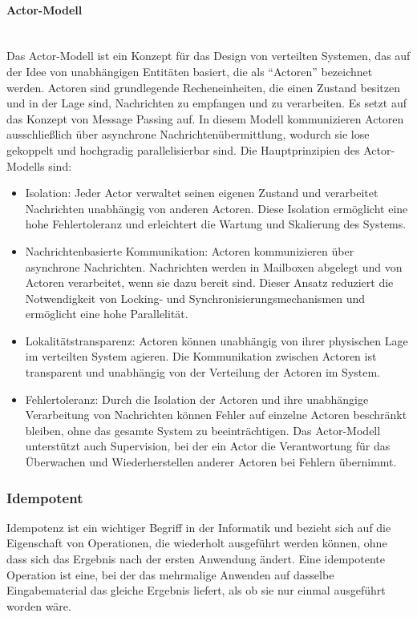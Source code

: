 \documentclass[../vs-script-first-v01.tex]{subfiles}
\begin{document}
\paragraph{Actor-Modell}\mbox{}\\
Das Actor-Modell ist ein Konzept für das Design von verteilten Systemen, das auf der Idee von unabhängigen Entitäten basiert, die als \enquote{Actoren} bezeichnet werden. Actoren sind grundlegende Recheneinheiten, die einen Zustand besitzen und in der Lage sind, Nachrichten zu empfangen und zu verarbeiten. Es setzt auf das Konzept von Message Passing auf. In diesem Modell kommunizieren Actoren ausschließlich über asynchrone Nachrichtenübermittlung, wodurch sie lose gekoppelt und hochgradig parallelisierbar sind. Die Hauptprinzipien des Actor-Modells sind:
\begin{itemize}
\item Isolation: Jeder Actor verwaltet seinen eigenen Zustand und verarbeitet Nachrichten unabhängig von anderen Actoren. Diese Isolation ermöglicht eine hohe Fehlertoleranz und erleichtert die Wartung und Skalierung des Systems.

\item Nachrichtenbasierte Kommunikation: Actoren kommunizieren über asynchrone Nachrichten. Nachrichten werden in Mailboxen abgelegt und von Actoren verarbeitet, wenn sie dazu bereit sind. Dieser Ansatz reduziert die Notwendigkeit von Locking- und Synchronisierungsmechanismen und ermöglicht eine hohe Parallelität.

\item Lokalitätstransparenz: Actoren können unabhängig von ihrer physischen Lage im verteilten System agieren. Die Kommunikation zwischen Actoren ist transparent und unabhängig von der Verteilung der Actoren im System.

\item Fehlertoleranz: Durch die Isolation der Actoren und ihre unabhängige Verarbeitung von Nachrichten können Fehler auf einzelne Actoren beschränkt bleiben, ohne das gesamte System zu beeinträchtigen. Das Actor-Modell unterstützt auch Supervision, bei der ein Actor die Verantwortung für das Überwachen und Wiederherstellen anderer Actoren bei Fehlern übernimmt.
\end{itemize}


\subsubsection{Idempotent}

Idempotenz ist ein wichtiger Begriff in der Informatik und bezieht sich auf die Eigenschaft von Operationen, die wiederholt ausgeführt werden können, ohne dass sich das Ergebnis nach der ersten Anwendung ändert. Eine idempotente Operation ist eine, bei der das mehrmalige Anwenden auf dasselbe Eingabematerial das gleiche Ergebnis liefert, als ob sie nur einmal ausgeführt worden wäre.
\end{document}
